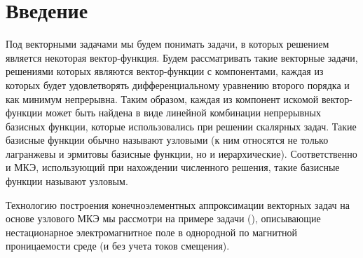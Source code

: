 \chapter*{Введение}


Под векторными задачами мы будем понимать задачи, в которых решением является некоторая вектор-функция. Будем рассматривать такие векторные задачи, решениями которых являются вектор-функции с компонентами, каждая из которых будет удовлетворять дифференциальному уравнению второго порядка и как минимум непрерывна. Таким образом, каждая из компонент искомой вектор-функции может быть найдена в виде линейной комбинации непрерывных базисных функции, которые использовались при решении скалярных задач. Такие базисные функции обычно называют узловыми (к ним относятся не только лагранжевы и эрмитовы базисные функции, но и иерархические). Соответственно и МКЭ, использующий при нахождении численного решения, такие базисные функции называют узловым.

Технологию построения конечноэлементных аппроксимации векторных задач на основе узлового МКЭ мы рассмотри на примере задачи (), описывающие нестационарное электромагнитное поле в однородной по магнитной проницаемости среде (и без учета токов смещения).